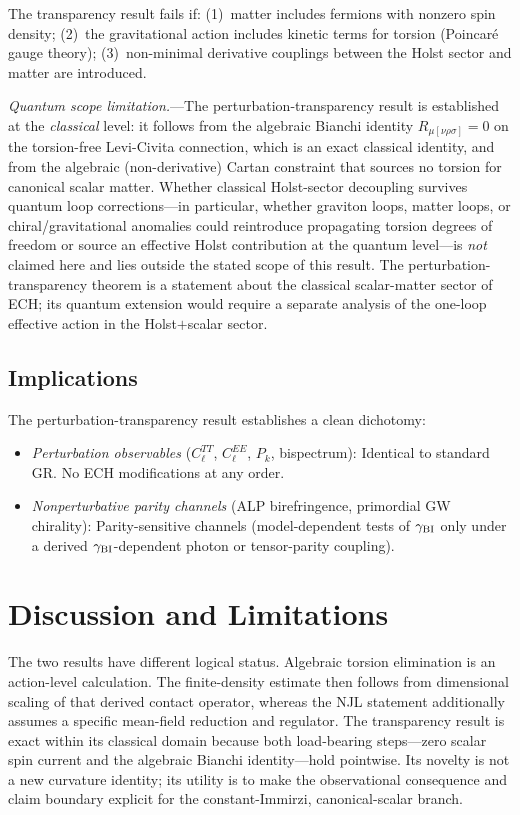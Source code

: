 \documentclass[aps,prd,twocolumn,superscriptaddress,showpacs,preprintnumbers,nofootinbib,longbibliography,floatfix]{revtex4-2}
\begin{document}
The transparency result fails if: (1)~matter includes fermions with nonzero
spin density; (2)~the gravitational action includes kinetic terms for torsion
(Poincar\'{e} gauge theory); (3)~non-minimal derivative couplings between the
Holst sector and matter are introduced.

\textit{Quantum scope limitation.}---The perturbation-transparency result is
established at the \emph{classical} level: it follows from the algebraic
Bianchi identity $R_{\mu[\nu\rho\sigma]}=0$ on the torsion-free Levi-Civita
connection, which is an exact classical identity, and from the algebraic
(non-derivative) Cartan constraint that sources no torsion for canonical
scalar matter. Whether classical Holst-sector decoupling survives quantum loop
corrections---in particular, whether graviton loops, matter loops, or
chiral/gravitational anomalies could reintroduce propagating torsion degrees of
freedom or source an effective Holst contribution at the quantum level---is
\emph{not} claimed here and lies outside the stated scope of this result.
The perturbation-transparency theorem is a statement about the classical
scalar-matter sector of ECH; its quantum extension would require a separate
analysis of the one-loop effective action in the Holst$+$scalar sector.

\subsection{Implications}

The perturbation-transparency result establishes a clean dichotomy:
\begin{itemize}[leftmargin=*]
\item \textit{Perturbation observables} ($C_\ell^{TT}$, $C_\ell^{EE}$, $P_k$,
bispectrum): Identical to standard GR. No ECH modifications at any order.
\item \textit{Nonperturbative parity channels} (ALP birefringence, primordial GW
chirality): Parity-sensitive channels (model-dependent tests of
$\gamma_{\rm BI}$ only under a derived $\gamma_{\rm BI}$-dependent photon
or tensor-parity coupling).
\end{itemize}

\section{Discussion and Limitations}\label{sec:discussion}

The two results have different logical status.  Algebraic torsion elimination
is an action-level calculation.  The finite-density estimate then follows
from dimensional scaling of that derived contact operator, whereas the NJL
statement additionally assumes a specific mean-field reduction and regulator.
The transparency result is exact within its classical domain because both
load-bearing steps---zero scalar spin current and the algebraic Bianchi
identity---hold pointwise.  Its novelty is not a new curvature identity; its
utility is to make the observational consequence and claim boundary explicit
for the constant-Immirzi, canonical-scalar branch.
\end{document}
